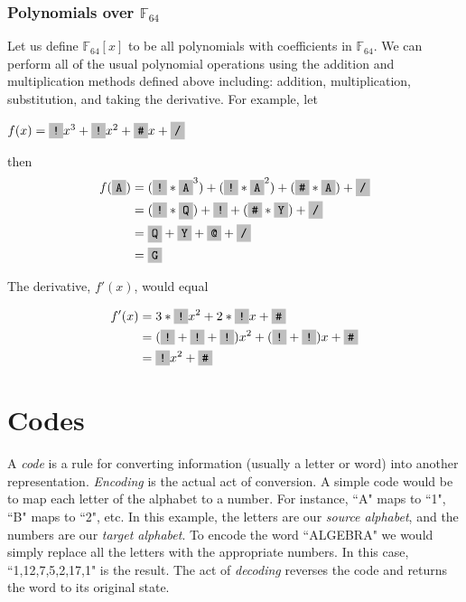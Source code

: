 \documentclass{article}
\begin{document}
\subsubsection{Polynomials over $\mathbb{F}_{64}$}
Let us define $\mathbb{F}_{64}[x]$ to be all polynomials with coefficients in $\mathbb{F}_{64}$. We can perform all of the usual polynomial operations using the addition and multiplication methods defined above including: addition, multiplication, substitution, and taking the derivative. For example, let
\begin{center}
$f(x) = \f{!}x^{3} + \f{!}x^{2} + \f{\#}x + \f{/}$
\end{center}

then
\begin{equation*}
\begin{split}
f(\f{A}) & = (\f{!} * \f{A}^{3}) + (\f{!} * \f{A}^{2}) + (\f{\#} * \f{A}) + \f{/} \\
& = (\f{!} * \f{Q}) + \f{!} + (\f{\#} * \f{Y}) + \f{/} \\
& = \f{Q} + \f{Y} + \f{@} + \f{/} \\
& = \f{G}
\end{split}
\end{equation*}

The derivative, $f'(x)$, would equal

\begin{equation*}
\begin{split}
f'(x) & = 3 * \f{!}x^{2} + 2 * \f{!}x + \f{\#} \\
& = (\f{!} + \f{!} + \f{!})x^{2} + (\f{!} + \f{!})x + \f{\#} \\
& = \f{!}x^{2} + \f{\#}
\end{split}
\end{equation*}


\section{Codes}
A \textit{code} is a rule for converting information (usually a letter or word) into another representation. \textit{Encoding} is the actual act of conversion. A simple code would be to map each letter of the alphabet to a number. For instance, ``A" maps to ``1", ``B" maps to ``2", etc. In this example, the letters are our \textit{source alphabet}, and the numbers are our \textit{target alphabet}. To encode the word ``ALGEBRA" we would simply replace all the letters with the appropriate numbers. In this case, ``1,12,7,5,2,17,1" is the result. The act of \textit{decoding} reverses the code and returns the word to its original state. 
\end{document}
